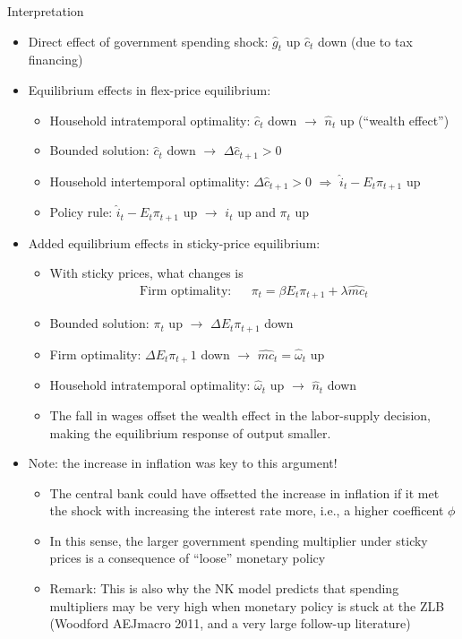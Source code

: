 \documentclass[9pt]{beamer}
\newcommand{\bit}{\begin{itemize}}
\newcommand{\eit}{\end{itemize}}
\begin{document}
\begin{frame}{Interpretation}

\bit
\setlength\itemsep{1em}
\item Direct effect of government spending shock: $\hat g_t$ up $\hat c_t$ down (due to tax financing)

\item Equilibrium effects in flex-price equilibrium:
\bit
\item Household intratemporal optimality: $\hat c_t$ down $\rightarrow$ $\hat n_t$ up (``wealth effect'')

\item Bounded solution: $\hat c_t$ down $\rightarrow$ $\Delta \hat c_{t+1} > 0$

\item Household intertemporal optimality: $\Delta \hat c_{t+1} > 0$  $\Rightarrow$ $\hat i_t - E_t \pi_{t+1}$ up

\item Policy rule: $\hat i_t - E_t \pi_{t+1}$ up $\rightarrow$ $i_t$ up and $\pi_t$ up

\eit


\item Added equilibrium effects in sticky-price equilibrium:
\bit
\item With sticky prices, what changes is
\begin{eqnarray}
\text{Firm optimality:} &&  \pi_t = \beta E_t \pi_{t+1} + \lambda \widehat{mc}_t \nonumber
\end{eqnarray}

\item Bounded solution: $\pi_t$ up $\rightarrow$ $\Delta E_t \pi_{t+1}$ down

\item Firm optimality: $\Delta E_t \pi_{t+}1$ down $\rightarrow$ $\widehat{mc}_t = \hat \omega_t$ up

\item Household intratemporal optimality: $\hat \omega_t$ up $\rightarrow$ $\hat n_t$ down

\item The fall in wages offset the wealth effect in the labor-supply decision, making the equilibrium response of output smaller.
\eit

\item Note: the increase in inflation was key to this argument!
\bit
\item The central bank could have offsetted the increase in inflation if it met the shock with increasing the interest rate more, i.e., a higher coefficent $\phi$

\item In this sense, the larger government spending multiplier under sticky prices is a consequence of ``loose'' monetary policy

\item Remark: This is also why the NK model predicts that spending multipliers may be very high when monetary policy is stuck at the ZLB (Woodford AEJmacro 2011, and a very large follow-up literature)

\eit


\eit


\end{frame}
\end{document}
